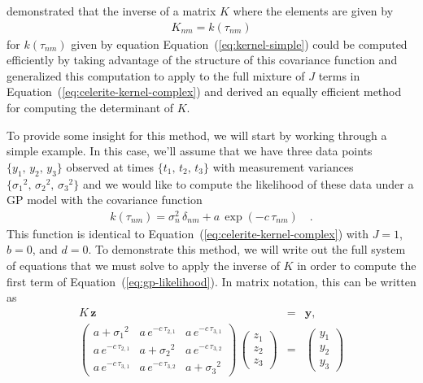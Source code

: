 \documentclass[manuscript, letterpaper]{aastex6}
\makeatletter
\let\origsubsection\subsection
\renewcommand\subsection{\@ifstar{\starsubsection}{\nostarsubsection}}
\newcommand\nostarsubsection[1]{\subsectionprelude\origsubsection{#1}}
\newcommand\starsubsection[1]{\subsectionprelude\origsubsection*{#1}}
\newcommand\subsectionprelude{\vspace{1em}}
\renewcommand{\eqref}[1]{\ref{eq:#1}}
\newcommand{\Eq}[1]{Equation~(\eqref{#1})}
\newcommand{\eq}[1]{\Eq{#1}}
\newcommand{\eqlabel}[1]{\label{eq:#1}}
\newcommand{\bvec}[1]{{\ensuremath{\boldsymbol{#1}}}}
\makeatother
\begin{document}
\citet{Rybicki:1995} demonstrated that the inverse of a matrix $K$ where the
elements are given by
\begin{eqnarray}
K_{nm} = k(\tau_{nm})
\end{eqnarray}
for $k(\tau_{nm})$ given by equation \eq{kernel-simple} could be computed
efficiently by taking advantage of the structure of this covariance function
and \citet{Ambikasaran:2015} generalized this computation to apply to the full
mixture of $J$ terms in \eq{celerite-kernel-complex} and derived an equally
efficient method for computing the determinant of $K$.

\subsection{An example}

To provide some insight for this method, we will start by working through a
simple example.
In this case, we'll assume that we have three data points
$\{y_1,\,y_2,\,y_3\}$ observed at times $\{t_1,\,t_2,\,t_3\}$ with measurement
variances $\{{\sigma_1}^2,\,{\sigma_2}^2,\,{\sigma_3}^2\}$ and we would
like to compute the likelihood of these data under a GP model with the
covariance function
\begin{eqnarray}
k(\tau_{nm}) = \sigma_n^2\,\delta_{nm} + a\,\exp(-c\,\tau_{nm})\quad.
\end{eqnarray}
This function is identical to \eq{celerite-kernel-complex} with $J=1$, $b=0$,
and $d=0$.
To demonstrate this method, we will write out the full system of
equations that we must solve to apply the inverse of $K$ in order to compute
the first term of \eq{gp-likelihood}.
In matrix notation, this can be written as
\begin{eqnarray}\eqlabel{impl-matrix}
K\,\bvec{z} &=& \bvec{y}, \\
\begin{pmatrix}
    a+{\sigma_1}^2 & a\,e^{-c\,\tau_{2,1}} & a\,e^{-c\,\tau_{3,1}}\\
    a\,e^{-c\,\tau_{2,1}} & a+{\sigma_2}^2 & a\,e^{-c\,\tau_{3,2}}\\
    a\,e^{-c\,\tau_{3,1}} & a\,e^{-c\,\tau_{3,2}} & a+{\sigma_3}^2
\end{pmatrix}\,
\begin{pmatrix}
    z_1 \\ z_2 \\ z_3
\end{pmatrix} &=&
\begin{pmatrix}
    y_1 \\ y_2 \\ y_3
\end{pmatrix}
\end{eqnarray}
\end{document}
